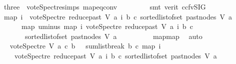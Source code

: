 \begin{isabellebody}
\ three\ {}\ vote{\isacharunderscore}{\kern0pt}Spectre{\isachardot}{\kern0pt}simps\ map{\isacharunderscore}{\kern0pt}eq{\isacharunderscore}{\kern0pt}conv\isanewline
\ \ \ \ \ \ \ \isamarkupfalse%
\ {\isacharparenleft}{\kern0pt}smt\ {\isacharparenleft}{\kern0pt}verit{\isacharcomma}{\kern0pt}\ ccfv{\isacharunderscore}{\kern0pt}SIG{\isacharparenright}{\kern0pt}{\isacharparenright}{\kern0pt}\isanewline
\ \ \ \ \ \isamarkupfalse%
\ {\isachardoublequoteopen}{\isacharparenleft}{\kern0pt}map\ {\isacharparenleft}{\kern0pt}{\isasymlambda}i{\isachardot}{\kern0pt}\ {\isacharminus}{\kern0pt}\ vote{\isacharunderscore}{\kern0pt}Spectre\ {\isacharparenleft}{\kern0pt}reduce{\isacharunderscore}{\kern0pt}past\ V\ a{\isacharparenright}{\kern0pt}\ i\ b\ c{\isacharparenright}{\kern0pt}\ {\isacharparenleft}{\kern0pt}sorted{\isacharunderscore}{\kern0pt}list{\isacharunderscore}{\kern0pt}of{\isacharunderscore}{\kern0pt}set\ {\isacharparenleft}{\kern0pt}past{\isacharunderscore}{\kern0pt}nodes\ V\ a{\isacharparenright}{\kern0pt}{\isacharparenright}{\kern0pt}{\isacharparenright}{\kern0pt}\isanewline
\ \ \ \ \ {\isacharequal}{\kern0pt}\ {\isacharparenleft}{\kern0pt}map\ uminus\ {\isacharparenleft}{\kern0pt}map\ {\isacharparenleft}{\kern0pt}{\isasymlambda}i{\isachardot}{\kern0pt}\ vote{\isacharunderscore}{\kern0pt}Spectre\ {\isacharparenleft}{\kern0pt}reduce{\isacharunderscore}{\kern0pt}past\ V\ a{\isacharparenright}{\kern0pt}\ i\ b\ c{\isacharparenright}{\kern0pt}\isanewline
\ \ \ \ \ \ \ {\isacharparenleft}{\kern0pt}sorted{\isacharunderscore}{\kern0pt}list{\isacharunderscore}{\kern0pt}of{\isacharunderscore}{\kern0pt}set\ {\isacharparenleft}{\kern0pt}past{\isacharunderscore}{\kern0pt}nodes\ V\ a{\isacharparenright}{\kern0pt}{\isacharparenright}{\kern0pt}{\isacharparenright}{\kern0pt}{\isacharparenright}{\kern0pt}{\isachardoublequoteclose}\ \isanewline
\ \ \ \ \ \ \ \isamarkupfalse%
\ map{\isacharunderscore}{\kern0pt}map\ \isamarkupfalse%
\ auto\ \ \ \ \ \ \ \isanewline
\ \ \ \ \ \isamarkupfalse%
\ \isamarkupfalse%
\ {\isachardoublequoteopen}vote{\isacharunderscore}{\kern0pt}Spectre\ V\ a\ c\ b\ {\isacharequal}{\kern0pt}\ {\isacharminus}{\kern0pt}\ {\isacharparenleft}{\kern0pt}sumlist{\isacharunderscore}{\kern0pt}break\ b\ c\ {\isacharparenleft}{\kern0pt}map\ {\isacharparenleft}{\kern0pt}{\isasymlambda}i{\isachardot}{\kern0pt}\isanewline
\ \ \ \ {\isacharparenleft}{\kern0pt}vote{\isacharunderscore}{\kern0pt}Spectre\ {\isacharparenleft}{\kern0pt}reduce{\isacharunderscore}{\kern0pt}past\ V\ a{\isacharparenright}{\kern0pt}\ i\ b\ c{\isacharparenright}{\kern0pt}{\isacharparenright}{\kern0pt}\ {\isacharparenleft}{\kern0pt}sorted{\isacharunderscore}{\kern0pt}list{\isacharunderscore}{\kern0pt}of{\isacharunderscore}{\kern0pt}set\ {\isacharparenleft}{\kern0pt}past{\isacharunderscore}{\kern0pt}nodes\ V\ a{\isacharparenright}{\kern0pt}{\isacharparenright}{\kern0pt}{\isacharparenright}{\kern0pt}{\isacharparenright}{\kern0pt}{\isachardoublequoteclose}\ \isanewline

\end{isabellebody}
